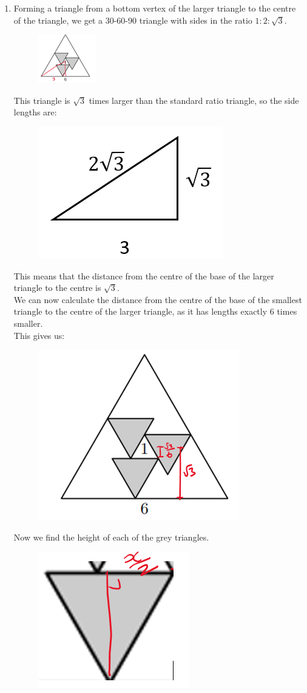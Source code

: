 \documentclass[../main.tex]{subfiles}
\begin{document}
\begin{enumerate}
    \item 
    Forming a triangle from a bottom vertex of the larger triangle to the centre of the triangle, we get a 30-60-90 triangle with sides in the ratio \(1:2:\sqrt{3}\).
    \begin{figure}[H]
        \centering
        \includegraphics[width=0.25\linewidth]{images/t2w3q4_a1.png}
    \end{figure}
    This triangle is \(\sqrt{3}\) times larger than the standard ratio triangle, so the side lengths are:
    \begin{figure}[H]
        \centering
        \includegraphics[width=0.2\linewidth]{images/t2w3q4_a2.png}
    \end{figure}
    This means that the distance from the centre of the base of the larger triangle to the centre is \(\sqrt{3}\).\\
    We can now calculate the distance from the centre of the base of the smallest triangle to the centre of the larger triangle, as it has lengths exactly 6 times smaller.\\
    This gives us:
    \begin{figure}[H]
        \centering
        \includegraphics[width=0.25\linewidth]{images/t2w3q4_a3.png}
    \end{figure}
    Now we find the height of each of the grey triangles.
    \begin{figure}[H]
        \centering
        \includegraphics[width=0.25\linewidth]{images/t2w3q4_a4.png}

\end{figure}
\end{enumerate}
\end{document}
